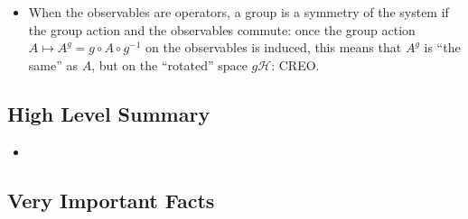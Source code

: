 \documentclass{article}
\begin{document}
\begin{itemize}
        \begin{itemize}
            
        
        
        \item When the observables are operators, a group is a symmetry of the system if the group action and the observables commute: once the group action $A \mapsto A^g = g \circ A \circ g^{-1}$ on the observables is induced, this means that $A^g$ is ``the same'' as $A$, but on the ``rotated'' space $g\mathcal H$:  CREO.
            
        \end{itemize}
    
    \end{itemize}

\subsection{High Level Summary}

    \begin{itemize}

    \item 
    
    \end{itemize}

\subsection{Very Important Facts}
\end{document}
